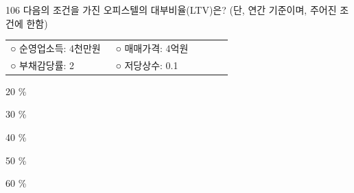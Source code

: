\begin{question}{106}
다음의 조건을 가진 오피스텔의 대부비율(LTV)은? (단, 연간 기준이며, 주어진 조건에 한함)
\begin{framedtext}
\begin{tabular}{@{}p{0.45\linewidth}p{0.5\linewidth}@{}}
○ 순영업소득: 4천만원 & ○ 매매가격: 4억원 \\
○ 부채감당률: 2 & ○ 저당상수: 0.1 \\
\end{tabular}
\end{framedtext}
\begin{choices}
  \item 20 \%
  \item 30 \%
  \item 40 \%
  \item 50 \%
  \item 60 \%
\end{choices}
\end{question}
